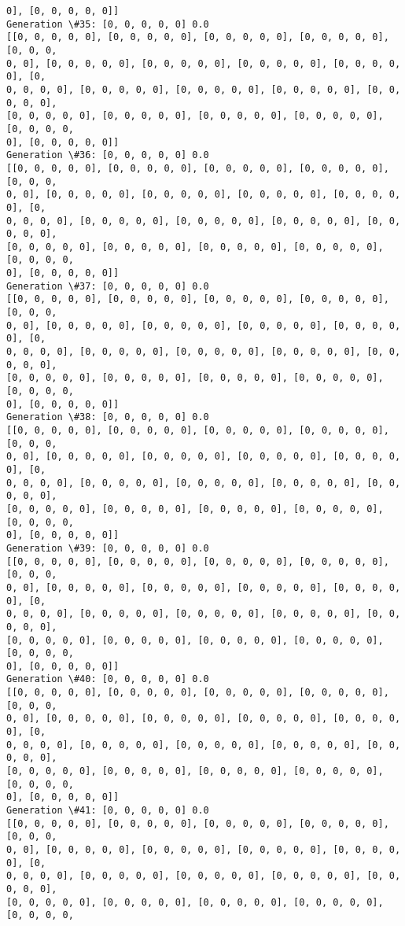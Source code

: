 \documentclass[11pt]{article}
\begin{document}
\begin{Verbatim}[commandchars=\\\{\}]
0], [0, 0, 0, 0, 0]]
Generation \#35: [0, 0, 0, 0, 0] 0.0
[[0, 0, 0, 0, 0], [0, 0, 0, 0, 0], [0, 0, 0, 0, 0], [0, 0, 0, 0, 0], [0, 0, 0,
0, 0], [0, 0, 0, 0, 0], [0, 0, 0, 0, 0], [0, 0, 0, 0, 0], [0, 0, 0, 0, 0], [0,
0, 0, 0, 0], [0, 0, 0, 0, 0], [0, 0, 0, 0, 0], [0, 0, 0, 0, 0], [0, 0, 0, 0, 0],
[0, 0, 0, 0, 0], [0, 0, 0, 0, 0], [0, 0, 0, 0, 0], [0, 0, 0, 0, 0], [0, 0, 0, 0,
0], [0, 0, 0, 0, 0]]
Generation \#36: [0, 0, 0, 0, 0] 0.0
[[0, 0, 0, 0, 0], [0, 0, 0, 0, 0], [0, 0, 0, 0, 0], [0, 0, 0, 0, 0], [0, 0, 0,
0, 0], [0, 0, 0, 0, 0], [0, 0, 0, 0, 0], [0, 0, 0, 0, 0], [0, 0, 0, 0, 0], [0,
0, 0, 0, 0], [0, 0, 0, 0, 0], [0, 0, 0, 0, 0], [0, 0, 0, 0, 0], [0, 0, 0, 0, 0],
[0, 0, 0, 0, 0], [0, 0, 0, 0, 0], [0, 0, 0, 0, 0], [0, 0, 0, 0, 0], [0, 0, 0, 0,
0], [0, 0, 0, 0, 0]]
Generation \#37: [0, 0, 0, 0, 0] 0.0
[[0, 0, 0, 0, 0], [0, 0, 0, 0, 0], [0, 0, 0, 0, 0], [0, 0, 0, 0, 0], [0, 0, 0,
0, 0], [0, 0, 0, 0, 0], [0, 0, 0, 0, 0], [0, 0, 0, 0, 0], [0, 0, 0, 0, 0], [0,
0, 0, 0, 0], [0, 0, 0, 0, 0], [0, 0, 0, 0, 0], [0, 0, 0, 0, 0], [0, 0, 0, 0, 0],
[0, 0, 0, 0, 0], [0, 0, 0, 0, 0], [0, 0, 0, 0, 0], [0, 0, 0, 0, 0], [0, 0, 0, 0,
0], [0, 0, 0, 0, 0]]
Generation \#38: [0, 0, 0, 0, 0] 0.0
[[0, 0, 0, 0, 0], [0, 0, 0, 0, 0], [0, 0, 0, 0, 0], [0, 0, 0, 0, 0], [0, 0, 0,
0, 0], [0, 0, 0, 0, 0], [0, 0, 0, 0, 0], [0, 0, 0, 0, 0], [0, 0, 0, 0, 0], [0,
0, 0, 0, 0], [0, 0, 0, 0, 0], [0, 0, 0, 0, 0], [0, 0, 0, 0, 0], [0, 0, 0, 0, 0],
[0, 0, 0, 0, 0], [0, 0, 0, 0, 0], [0, 0, 0, 0, 0], [0, 0, 0, 0, 0], [0, 0, 0, 0,
0], [0, 0, 0, 0, 0]]
Generation \#39: [0, 0, 0, 0, 0] 0.0
[[0, 0, 0, 0, 0], [0, 0, 0, 0, 0], [0, 0, 0, 0, 0], [0, 0, 0, 0, 0], [0, 0, 0,
0, 0], [0, 0, 0, 0, 0], [0, 0, 0, 0, 0], [0, 0, 0, 0, 0], [0, 0, 0, 0, 0], [0,
0, 0, 0, 0], [0, 0, 0, 0, 0], [0, 0, 0, 0, 0], [0, 0, 0, 0, 0], [0, 0, 0, 0, 0],
[0, 0, 0, 0, 0], [0, 0, 0, 0, 0], [0, 0, 0, 0, 0], [0, 0, 0, 0, 0], [0, 0, 0, 0,
0], [0, 0, 0, 0, 0]]
Generation \#40: [0, 0, 0, 0, 0] 0.0
[[0, 0, 0, 0, 0], [0, 0, 0, 0, 0], [0, 0, 0, 0, 0], [0, 0, 0, 0, 0], [0, 0, 0,
0, 0], [0, 0, 0, 0, 0], [0, 0, 0, 0, 0], [0, 0, 0, 0, 0], [0, 0, 0, 0, 0], [0,
0, 0, 0, 0], [0, 0, 0, 0, 0], [0, 0, 0, 0, 0], [0, 0, 0, 0, 0], [0, 0, 0, 0, 0],
[0, 0, 0, 0, 0], [0, 0, 0, 0, 0], [0, 0, 0, 0, 0], [0, 0, 0, 0, 0], [0, 0, 0, 0,
0], [0, 0, 0, 0, 0]]
Generation \#41: [0, 0, 0, 0, 0] 0.0
[[0, 0, 0, 0, 0], [0, 0, 0, 0, 0], [0, 0, 0, 0, 0], [0, 0, 0, 0, 0], [0, 0, 0,
0, 0], [0, 0, 0, 0, 0], [0, 0, 0, 0, 0], [0, 0, 0, 0, 0], [0, 0, 0, 0, 0], [0,
0, 0, 0, 0], [0, 0, 0, 0, 0], [0, 0, 0, 0, 0], [0, 0, 0, 0, 0], [0, 0, 0, 0, 0],
[0, 0, 0, 0, 0], [0, 0, 0, 0, 0], [0, 0, 0, 0, 0], [0, 0, 0, 0, 0], [0, 0, 0, 0,

\end{Verbatim}
\end{document}
